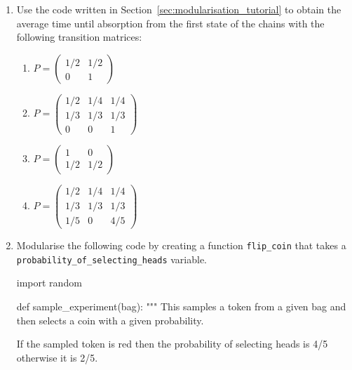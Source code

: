 \begin{enumerate}

\item 

Use the code written in Section~\ref{sec:modularisation_tutorial} to obtain the average time
until absorption from the first state of the  chains with the following transition 
matrices:
\begin{enumerate}

\item 

\(P = \begin{pmatrix}1/2 & 1/2 \\ 0 & 1 \end{pmatrix}\)

\item 

\(P = \begin{pmatrix}1/2 & 1/4 & 1/4\\ 1/3 & 1/3 & 1/3  \\0 & 0 & 1 \end{pmatrix}\)

\item 

\(P = \begin{pmatrix}1 & 0 \\ 1/2 & 1/2 \end{pmatrix}\)

\item 

\(P = \begin{pmatrix}1/2 & 1/4 & 1/4\\ 1/3 & 1/3 & 1/3  \\1/5 & 0 & 4/5 \end{pmatrix}\)

\end{enumerate}

\item 

Modularise the following code by creating a function \texttt{flip\_coin} that takes a
\texttt{probability\_of\_selecting\_heads} variable.

\begin{pyin}
import random

def sample_experiment(bag):
    """
    This samples a token from a given bag and then
    selects a coin with a given probability.

    If the sampled token is red then the probability
    of selecting heads is 4/5 otherwise it is 2/5.


\end{pyin}
\end{enumerate}
